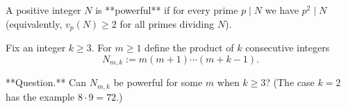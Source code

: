 A positive integer $N$ is **powerful** if for every prime $p\mid N$ we have $p^2\mid N$ (equivalently, $v_p(N)\ge 2$ for all primes dividing $N$).

Fix an integer $k\ge 3$. For $m\ge 1$ define the product of $k$ consecutive integers
\[
N_{m,k}:= m(m+1)\cdots (m+k-1).
\]

**Question.** Can $N_{m,k}$ be powerful for some $m$ when $k\ge 3$? (The case $k=2$ has the example $8\cdot 9=72$.)
